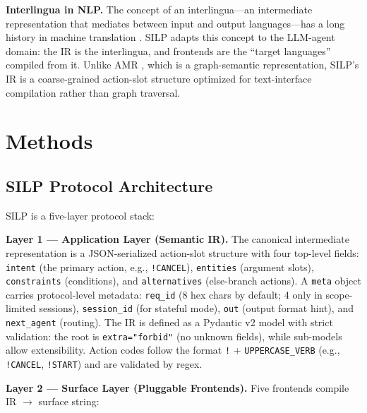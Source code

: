 \documentclass{article}
\begin{document}
\textbf{Interlingua in NLP.} The concept of an interlingua---an intermediate representation that mediates between input and output languages---has a long history in machine translation \citep{hutchins1995mt}. SILP adapts this concept to the LLM-agent domain: the IR is the interlingua, and frontends are the ``target languages'' compiled from it. Unlike AMR \citep{banarescu2013amr}, which is a graph-semantic representation, SILP's IR is a coarse-grained action-slot structure optimized for text-interface compilation rather than graph traversal.



\section{Methods}\label{methods}



\subsection{SILP Protocol Architecture}\label{silp-protocol-architecture}



SILP is a five-layer protocol stack:



\textbf{Layer 1 --- Application Layer (Semantic IR).} The canonical intermediate representation is a JSON-serialized action-slot structure with four top-level fields: \texttt{intent} (the primary action, e.g., \texttt{!CANCEL}), \texttt{entities} (argument slots), \texttt{constraints} (conditions), and \texttt{alternatives} (else-branch actions). A \texttt{meta} object carries protocol-level metadata: \texttt{req\_id} (8 hex chars by default; 4 only in scope-limited sessions), \texttt{session\_id} (for stateful mode), \texttt{out} (output format hint), and \texttt{next\_agent} (routing). The IR is defined as a Pydantic v2 model with strict validation: the root is \texttt{extra="forbid"} (no unknown fields), while sub-models allow extensibility. Action codes follow the format \texttt{!} + \texttt{UPPERCASE\_VERB} (e.g., \texttt{!CANCEL}, \texttt{!START}) and are validated by regex.



\textbf{Layer 2 --- Surface Layer (Pluggable Frontends).} Five frontends compile IR $\to$ surface string:
\end{document}
